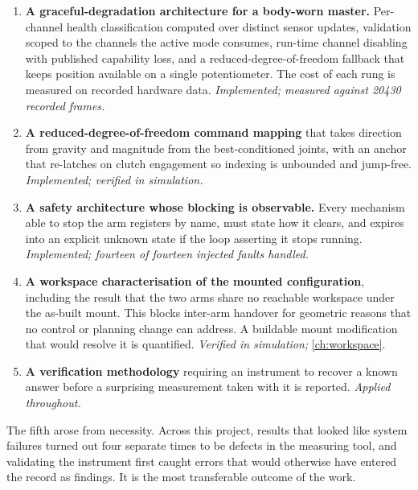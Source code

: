 \begin{enumerate}
  \item \textbf{A graceful-degradation architecture for a body-worn master.}
    Per-channel health classification computed over distinct sensor updates,
    validation scoped to the channels the active mode consumes, run-time
    channel disabling with published capability loss, and a reduced-degree-of-freedom
    fallback that keeps position available on a single potentiometer.
    The cost of each rung is measured on recorded hardware data.
    \emph{Implemented; measured against \num{20430} recorded frames.}

  \item \textbf{A reduced-degree-of-freedom command mapping} that takes
    direction from gravity and magnitude from the best-conditioned joints,
    with an anchor that re-latches on clutch engagement so indexing is
    unbounded and jump-free. \emph{Implemented; verified in simulation.}

  \item \textbf{A safety architecture whose blocking is observable.} Every
    mechanism able to stop the arm registers by name, must state how it
    clears, and expires into an explicit unknown state if the loop asserting
    it stops running. \emph{Implemented; fourteen of fourteen injected faults
    handled.}

  \item \textbf{A workspace characterisation of the mounted configuration},
    including the result that the two arms share no reachable workspace under
    the as-built mount. This blocks inter-arm handover for geometric reasons
    that no control or planning change can address. A buildable mount
    modification that would resolve it is quantified.
    \emph{Verified in simulation;} \cref{ch:workspace}.

  \item \textbf{A verification methodology} requiring an instrument to recover
    a known answer before a surprising measurement taken with it is reported.
    \emph{Applied throughout.}
\end{enumerate}

The fifth arose from necessity. Across this project, results that looked like
system failures turned out four separate times to be defects in the measuring
tool, and validating the instrument first caught errors that would otherwise
have entered the record as findings. It is the most transferable outcome of
the work.

